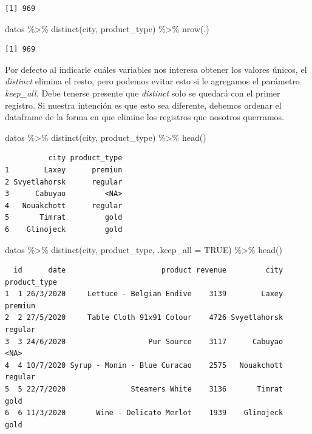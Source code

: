 \documentclass[
  letterpaper,
  DIV=11,
  numbers=noendperiod]{scrreprt}
\newenvironment{Shaded}{\begin{snugshade}}{\end{snugshade}}
\newcommand{\AttributeTok}[1]{\textcolor[rgb]{0.40,0.45,0.13}{#1}}
\newcommand{\ConstantTok}[1]{\textcolor[rgb]{0.56,0.35,0.01}{#1}}
\newcommand{\FunctionTok}[1]{\textcolor[rgb]{0.28,0.35,0.67}{#1}}
\newcommand{\NormalTok}[1]{\textcolor[rgb]{0.00,0.23,0.31}{#1}}
\newcommand{\SpecialCharTok}[1]{\textcolor[rgb]{0.37,0.37,0.37}{#1}}
\begin{document}
\begin{verbatim}
[1] 969
\end{verbatim}

\begin{Shaded}
\begin{Highlighting}[]
\NormalTok{datos }\SpecialCharTok{\%\textgreater{}\%} 
  \FunctionTok{distinct}\NormalTok{(city, product\_type) }\SpecialCharTok{\%\textgreater{}\%} 
  \FunctionTok{nrow}\NormalTok{(.)}
\end{Highlighting}
\end{Shaded}

\begin{verbatim}
[1] 969
\end{verbatim}

Por defecto al indicarle cuáles variables nos interesa obtener los
valores únicos, el \emph{distinct} elimina el resto, pero podemos evitar
esto si le agregamos el parámetro \emph{keep\_all.} Debe tenerse
presente que \emph{distinct} solo se quedará con el primer registro. Si
nuestra intención es que esto sea diferente, debemos ordenar el
dataframe de la forma en que elimine los registros que nosotros
querramos.

\begin{Shaded}
\begin{Highlighting}[]
\NormalTok{datos }\SpecialCharTok{\%\textgreater{}\%} 
  \FunctionTok{distinct}\NormalTok{(city, product\_type) }\SpecialCharTok{\%\textgreater{}\%} 
  \FunctionTok{head}\NormalTok{()}
\end{Highlighting}
\end{Shaded}

\begin{verbatim}
          city product_type
1        Laxey      premiun
2 Svyetlahorsk      regular
3      Cabuyao         <NA>
4   Nouakchott      regular
5       Timrat         gold
6    Glinojeck         gold
\end{verbatim}

\begin{Shaded}
\begin{Highlighting}[]
\NormalTok{datos }\SpecialCharTok{\%\textgreater{}\%} 
  \FunctionTok{distinct}\NormalTok{(city, product\_type, }\AttributeTok{.keep\_all =} \ConstantTok{TRUE}\NormalTok{) }\SpecialCharTok{\%\textgreater{}\%} 
  \FunctionTok{head}\NormalTok{()}
\end{Highlighting}
\end{Shaded}

\begin{verbatim}
  id      date                      product revenue         city product_type
1  1 26/3/2020     Lettuce - Belgian Endive    3139        Laxey      premiun
2  2 27/5/2020     Table Cloth 91x91 Colour    4726 Svyetlahorsk      regular
3  3 24/6/2020                   Pur Source    3117      Cabuyao         <NA>
4  4 10/7/2020 Syrup - Monin - Blue Curacao    2575   Nouakchott      regular
5  5 22/7/2020               Steamers White    3136       Timrat         gold
6  6 11/3/2020       Wine - Delicato Merlot    1939    Glinojeck         gold
\end{verbatim}
\end{document}
